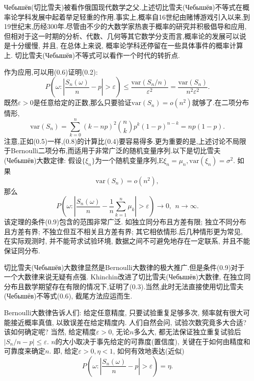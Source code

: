 Чебышёв(切比雪夫)被看作俄国现代数学之父.上述切比雪夫(Чебышёв)不等式在概率论学科发展中起着举足轻重的作用.事实上,概率自16世纪由赌博游戏引入以来,到19世纪末,历经300年.尽管由不少的大数学家热衷于概率的研究并积极倡导和应用,但相对于这一时期的分析、代数、几何等其它数学分支而言,概率论的发展可以说是十分缓慢, 并且, 在总体上来说, 概率论学科还停留在一些具体事件的概率计算上.  切比雪夫(Чебышёв)不等式可以看作一个时代的转折点.

作为应用,可以用(0.6)证明(0.2):
\begin{equation}
	P\left(\omega:\left|\frac{S_n(\omega)}{n}-p\right|>\varepsilon \right)
	\leqslant \frac{\mathrm{var}(S_n/n)}{\varepsilon^2} = \frac{\mathrm{var}(S_n)}{n^2\varepsilon^2}.
\end{equation}
既然$\varepsilon>0$是任意给定的正数,那么只要验证$\mathrm{var}(S_n) = o(n^2)$就够了.在二项分布情形,
\begin{equation}
	\mathrm{var}(S_n) = \sum_{k=0}^n(k-np)^2\binom{n}{k}p^k(1-p)^{n-k} = np(1-p).
\end{equation}
注意,正如(0.5)一样,(0.8)的计算比(0.4)要容易得多.更为重要的是,上述讨论不局限于Bernoulli二项分布,而适用于非常广泛的随机变量序列.以下是切比雪夫(Чебышёв)大数定律:
假设$\{\xi_n\}$为一个随机变量序列,$\mathrm{E}\xi_n = \mu_n, \mathrm{var}(\xi_n) = \sigma^2$. 如果\begin{equation}
	\mathrm{var}(S_n) = o(n^2),
\end{equation}
那么\begin{equation}
	P\left(\omega:\left|\frac{S_n(\omega)}{n}-\frac{1}{n}\sum_{k=1}^n\mu_k\right|>\varepsilon \right)\to 0,~~n\to\infty.
\end{equation}
该定理的条件(0.9)包含的范围非常广泛. 如独立同分布且方差有限; 独立不同分布且方差有界; 不独立但互不相关且方差有界; 其它相依情形.后几种情形更为常见, 在实际观测时, 并不能苛求试验环境, 数据之间不可避免地存在一定联系, 并且不能保证同分布.

切比雪夫(Чебышёв)大数律显然是Bernoulli大数律的极大推广.但是条件(0.9)对于一个大数律来说无疑有点强. Khinchin改进了切比雪夫(Чебышёв)大数律, 在独立同分布且数学期望存在有限的情况下,证明了(0.3).当然,此时无法直接使用切比雪夫(Чебышёв)不等式(0.6), 截尾方法应运而生.

Bernoulli大数律告诉人们: 给定任意精度, 只要试验重复足够多次, 频率就有很大可能接近概率真值, 以致误差在给定精度内. 人们自然会问, 试验次数究竟多大合适? 该如何确定呢? 当然, 给定精度$\varepsilon>0$, 无论$n$多么大, 都无法保证独立重复试验后$|S_n/n-p|\leqslant\varepsilon$. $n$的大小取决于事先给定的可靠度(置信度), 关键在于如何由精度和可靠度来确定$n$. 即, 给定$\varepsilon>0,\eta<1$, 如何有效地表达(近似)\begin{equation}
	P\left( \omega:\left| \frac{S_n(\omega)}{n}-p \right|>\varepsilon \right) = \eta.
\end{equation}

